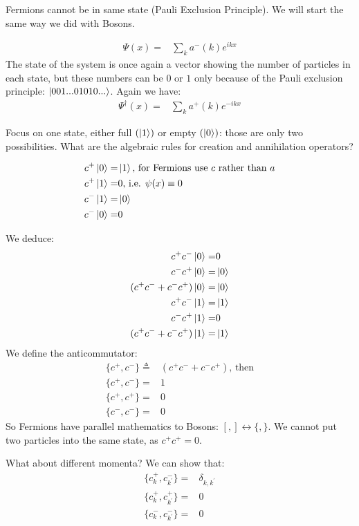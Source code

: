 \documentclass[]{article}
\begin{document}
Fermions cannot be in same state (Pauli Exclusion Principle). We will start the same way we did with Bosons.

\begin{align*}
	\Psi(x) =& \sum_k a^-(k) e^{ikx}
\end{align*}
The state of the system is once again a vector showing the number of particles in each state, but these numbers can be $0$ or $1$ only because of the Pauli exclusion principle: $\ket{001...01010...}$. Again we have:
\begin{align*}
	\Psi^\dagger(x) =& \sum_k a^+(k) e^{-ikx}
\end{align*}

Focus on one state, either full $(\ket{1})$ or empty $(\ket{0})$: those are only two possibilities. What are the algebraic rules for creation and annihilation operators?

\begin{align*}
	c^+\ket{0} =& \ket{1} \text{, for Fermions use $c$ rather than $a$}\\
	c^+\ket{1} =& 0 \text{, i.e. $\psi(x) \equiv 0$}\\
	c^-\ket{1} =& \ket{0}\\
	c^-\ket{0} =& 0\\
\end{align*}

We deduce:
\begin{align*}
	c^+c^-\ket{0} =& 0\\
	c^-c^+\ket{0} =& \ket{0}\\
	(c^+c^-+c^-c^+)\ket{0} =& \ket{0}\\
	c^+c^-\ket{1} =& \ket{1} \\
	c^-c^+\ket{1} =&0 \\
	(c^+c^-+c^-c^+)\ket{1} =& \ket{1}
\end{align*}
We define the anticommutator:
\begin{align*}
	\{c^+,c^-\} \triangleq& (c^+c^-+c^-c^+) \text{, then}\\
	\{c^+,c^-\} =& 1\\
	\{c^+,c^+\} =&0 \\
	\{c^-,c^-\} =&0
\end{align*}
So Fermions have parallel mathematics to Bosons: $[,] \leftrightarrow \{,\}$. We cannot put two particles into the same state, as $c^+c^+=0$.

What about different momenta? We can show that:
\begin{align*}
	\{c^+_k,c^-_{k^\prime} \} =& \delta_{k,k^\prime} \\
	\{c^+_k,c^+_{k^\prime} \} =&0 \\
	\{c^-_k,c^-_{k^\prime} \} =&0
\end{align*}
\end{document}
